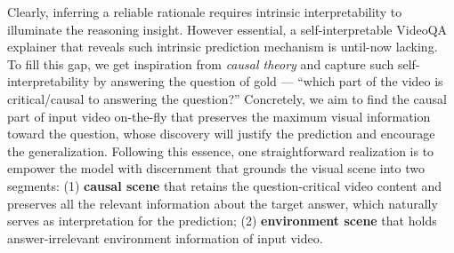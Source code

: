 


%



Clearly, inferring a reliable rationale requires intrinsic interpretability to illuminate the reasoning insight. 
%
However essential, a self-interpretable VideoQA explainer that reveals such intrinsic prediction mechanism is until-now lacking.
%
To fill this gap, we get inspiration from \textit{causal theory} \cite{pearl2016causal} and capture such self-interpretability by answering the question of gold --- ``which part of the video is critical/causal to answering the question?'' 
% 
Concretely, we aim to find the causal part of input video on-the-fly that preserves the maximum visual information toward the question, whose discovery will justify the prediction and encourage the generalization.
%
Following this essence, one straightforward realization is to empower the model with discernment that grounds the visual scene into two segments: 
(1) \textbf{causal scene} that retains the question-critical video content and preserves all the relevant information about the target answer, which naturally serves as interpretation for the prediction; (2) \textbf{environment scene} that holds answer-irrelevant environment information of input video. 

%

%

